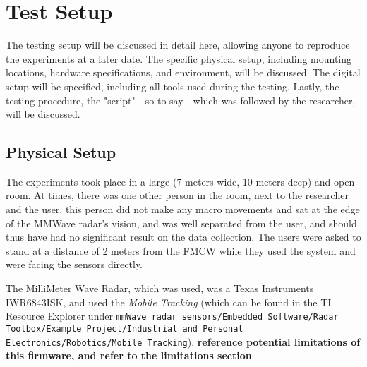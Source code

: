 \section{Test Setup}
\label{section: experiments - test setup}
The testing setup will be discussed in detail here, allowing anyone to reproduce the experiments at a later date.
The specific physical setup, including mounting locations, hardware specifications, and environment, will be discussed.
The digital setup will be specified, including all tools used during the testing.
Lastly, the testing procedure, the "script" - so to say - which was followed by the researcher, will be discussed.




\subsection{Physical Setup}
\label{sub-section: experiments - test setup - physical space}
The experiments took place in a large (7 meters wide, 10 meters deep) and open room. 
At times, there was one other person in the room, next to the researcher and the user, this person did not make any macro movements and sat at the edge of the MMWave radar's vision, and was well separated from the user, and should thus have had no significant result on the data collection.
The users were asked to stand at a distance of 2 meters from the FMCW while they used the system and were facing the sensors directly.

The MilliMeter Wave Radar, which was used, was a Texas Instruments IWR6843ISK, and used the \textit{Mobile Tracking} (which can be found in the TI Resource Explorer under \texttt{mmWave radar sensors/Embedded Software/Radar Toolbox/Example Project/Industrial and Personal Electronics/Robotics/Mobile Tracking}).
\textbf{reference potential limitations of this firmware, and refer to the limitations section}

